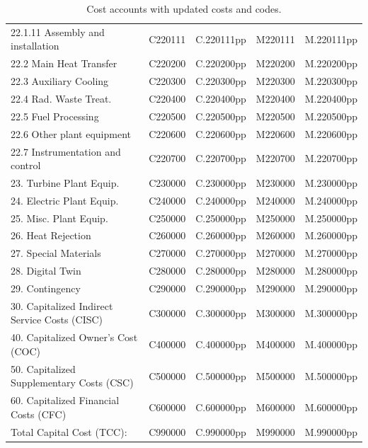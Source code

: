 \begin{table}[h!]
{\begin{tabular}{lcccc}
\hspace{15mm}22.1.11 Assembly and installation & C220111 & C.220111pp & M220111 & M.220111pp \\
\hspace{10mm}22.2 Main Heat Transfer & C220200 & C.220200pp & M220200 & M.220200pp \\
\hspace{10mm}22.3 Auxiliary Cooling & C220300 & C.220300pp & M220300 & M.220300pp \\
\hspace{10mm}22.4 Rad. Waste Treat. & C220400 & C.220400pp & M220400 & M.220400pp \\
\hspace{10mm}22.5 Fuel Processing & C220500 & C.220500pp & M220500 & M.220500pp \\
\hspace{10mm}22.6 Other plant equipment & C220600 & C.220600pp & M220600 & M.220600pp \\
\hspace{10mm}22.7 Instrumentation and control & C220700 & C.220700pp & M220700 & M.220700pp \\
\hspace{5mm}23. Turbine Plant Equip. & C230000 & C.230000pp & M230000 & M.230000pp \\
\hspace{5mm}24. Electric Plant Equip. & C240000 & C.240000pp & M240000 & M.240000pp \\
\hspace{5mm}25. Misc. Plant Equip. & C250000 & C.250000pp & M250000 & M.250000pp \\
\hspace{5mm}26. Heat Rejection & C260000 & C.260000pp & M260000 & M.260000pp \\
\hspace{5mm}27. Special Materials & C270000 & C.270000pp & M270000 & M.270000pp \\
\hspace{5mm}28. Digital Twin & C280000 & C.280000pp & M280000 & M.280000pp \\
\hspace{5mm}29. Contingency & C290000 & C.290000pp & M290000 & M.290000pp \\
30. Capitalized Indirect Service Costs (CISC) & C300000 & C.300000pp & M300000 & M.300000pp \\
40. Capitalized Owner's Cost (COC) & C400000 & C.400000pp & M400000 & M.400000pp \\
50. Capitalized Supplementary Costs (CSC) & C500000 & C.500000pp & M500000 & M.500000pp \\
60. Capitalized Financial Costs (CFC) & C600000 & C.600000pp & M600000 & M.600000pp \\
\hline
Total Capital Cost (TCC): & C990000 & C.990000pp & M990000 & M.990000pp \\
\hline
\end{tabular}
}
\caption{Cost accounts with updated costs and codes. }
\label{tab:costsupdatedcodes}
\end{table}

